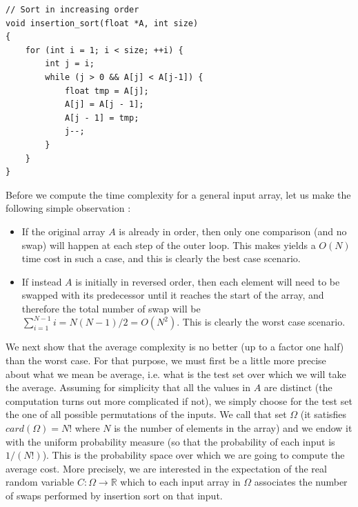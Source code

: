 \documentclass[12pt]{article}
\theoremstyle{plain}
\theoremstyle{remark}
\begin{document}
\begin{lstlisting}[style=C]
// Sort in increasing order 
void insertion_sort(float *A, int size)
{
	for (int i = 1; i < size; ++i) {
		int j = i;
		while (j > 0 && A[j] < A[j-1]) {
			float tmp = A[j];
			A[j] = A[j - 1];
			A[j - 1] = tmp;
			j--;
		}
	}
}
\end{lstlisting}

Before we compute the time complexity for a general input array, let us make the
following simple observation :
\begin{itemize}
	\item If the original array $A$ is already in order,
		then only one comparison (and no swap) will happen at each step
		of the outer loop. This makes yields a $O(N)$ time cost in such
		a case, and this is clearly the best case scenario.
	\item If instead $A$ is initially in reversed order, then each element
		will need to be swapped with its predecessor until it reaches the
		start of the array, and therefore the total number of swap will 
		be $\sum_{i = 1}^{N - 1} i = N(N-1)/2 = O(N^2)$. This is clearly
		the worst case scenario.
\end{itemize}

We next show that the average complexity is no better (up to a factor one half) than
the worst case. For that purpose, we must first be a little more precise about what
we mean be average, i.e. what is the test set over which we will take the
average. Assuming for simplicity that all the values in $A$ are distinct 
(the computation turns out more complicated if not), we simply choose 
for the test set the one of all possible permutations of the inputs. We call 
that set $\Omega$ (it satisfies $card(\Omega) = N!$ where $N$ is the number of
elements in the array) and we endow it with the uniform probability measure (so
that the probability of each input is $1/(N!)$). This is the probability space
over which we are going to compute the average cost. More precisely, we are
interested in the expectation of the real random variable $C : \Omega \to \mathbb{R}$ which 
to each input array in $\Omega$ associates the number of swaps performed by insertion sort 
on that input.
\end{document}
